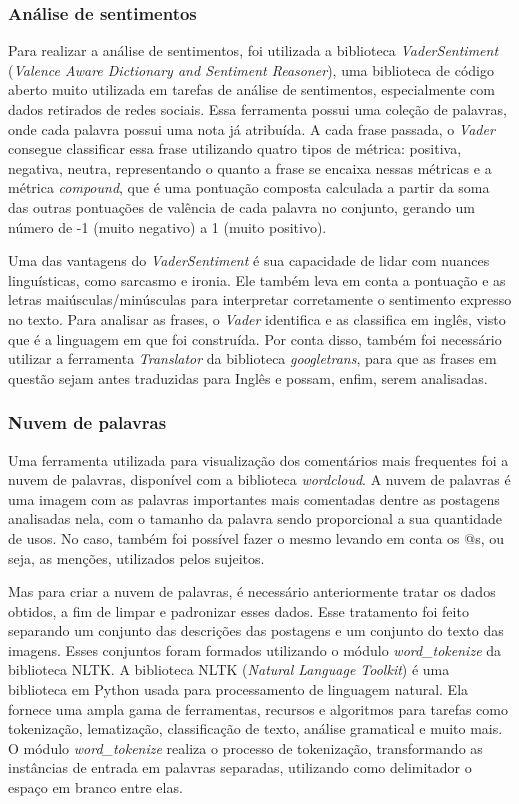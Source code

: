 \documentclass[manuscript,screen,review]{acmart}
\begin{document}
\subsubsection{Análise de sentimentos}

Para realizar a análise de sentimentos, foi utilizada a biblioteca \textit{VaderSentiment} (\textit{Valence Aware Dictionary and Sentiment Reasoner}), uma biblioteca de código aberto muito utilizada em tarefas de análise de sentimentos, especialmente com dados retirados de redes sociais. Essa ferramenta possui uma coleção de palavras, onde cada palavra possui uma nota já atribuída. A cada frase passada, o \textit{Vader} consegue classificar essa frase utilizando quatro tipos de métrica: positiva, negativa, neutra, representando o quanto a frase se encaixa nessas métricas e a métrica \textit{compound}, que é uma pontuação composta calculada a partir da soma das outras pontuações de valência de cada palavra no conjunto, gerando um número de -1 (muito negativo) a 1 (muito positivo).

Uma das vantagens do \textit{VaderSentiment} é sua capacidade de lidar com nuances linguísticas, como sarcasmo e ironia. Ele também leva em conta a pontuação e as letras maiúsculas/minúsculas para interpretar corretamente o sentimento expresso no texto. Para analisar as frases, o \textit{Vader} identifica e as classifica em inglês, visto que é a linguagem em que foi construída. Por conta disso, também foi necessário utilizar a ferramenta \textit{Translator} da biblioteca \textit{googletrans}, para que as frases em questão sejam antes traduzidas para Inglês e possam, enfim, serem analisadas.

\subsubsection{Nuvem de palavras}

Uma ferramenta utilizada para visualização dos comentários mais frequentes foi a nuvem de palavras, disponível com a biblioteca \textit{wordcloud}. A nuvem de palavras é uma imagem com as palavras importantes mais comentadas dentre as postagens analisadas nela, com o tamanho da palavra sendo proporcional a sua quantidade de usos. No caso, também foi possível fazer o mesmo levando em conta os @s, ou seja, as menções, utilizados pelos sujeitos.

Mas para criar a nuvem de palavras, é necessário anteriormente tratar os dados obtidos, a fim de limpar e padronizar esses dados. Esse tratamento foi feito separando um conjunto das descrições das postagens e um conjunto do texto das imagens. Esses conjuntos foram formados utilizando o módulo \textit{word\_tokenize} da biblioteca NLTK. A biblioteca NLTK (\textit{Natural Language Toolkit}) é uma biblioteca em Python usada para processamento de linguagem natural. Ela fornece uma ampla gama de ferramentas, recursos e algoritmos para tarefas como tokenização, lematização, classificação de texto, análise gramatical e muito mais. O módulo \textit{word\_tokenize} realiza o processo de tokenização, transformando as instâncias de entrada em palavras separadas, utilizando como delimitador o espaço em branco entre elas.
\end{document}
